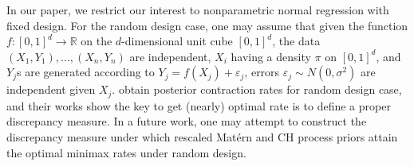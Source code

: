 \documentclass[ejs,noshowframe]{imsart}
\theoremstyle{plain}
\theoremstyle{definition}
\theoremstyle{remark}
\begin{document}
In our paper, we restrict our interest to nonparametric normal regression with fixed design.  For the random design case,  one may assume that given the function $f:[0,1]^d \rightarrow \mathbb{R}$ on the $d$-dimensional unit cube $[0,1]^d$,  the data $\left(X_1, Y_1\right), \ldots,\left(X_n, Y_n\right)$ are independent, $X_i$ having a density $\pi$ on $[0,1]^d$, and $Y_j$s are generated according to $Y_j=f\left(X_j\right)+\varepsilon_j$,  errors $\varepsilon_j \sim N\left(0, \sigma^2\right)$  are independent given $X_j$. \cite{van2011information,pati2015optimal,10.1214/20-AOS2043} obtain  posterior contraction rates for random design case, and their works show the key to get (nearly) optimal rate is to define a proper discrepancy measure.  In a future work, one may attempt to construct
the discrepancy measure under which rescaled Mat\'ern and CH  process priors attain the optimal minimax rates under random design.
\end{document}

